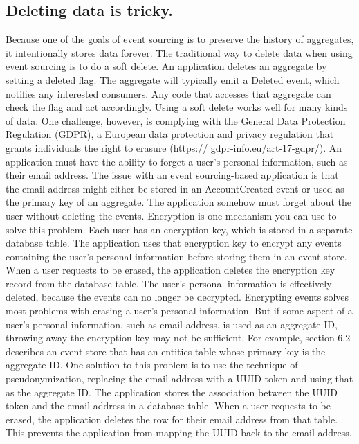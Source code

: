 \subsection{Deleting data is tricky.}

Because one of the goals of event sourcing is to preserve the history of aggregates, it
intentionally stores data forever. The traditional way to delete data when using event
sourcing is to do a soft delete. An application deletes an aggregate by setting a
deleted flag. The aggregate will typically emit a Deleted event, which notifies any
interested consumers. Any code that accesses that aggregate can check the flag and
act accordingly.
 Using a soft delete works well for many kinds of data. One challenge, however, is
complying with the General Data Protection Regulation (GDPR), a European data
protection and privacy regulation that grants individuals the right to erasure (https://
gdpr-info.eu/art-17-gdpr/). An application must have the ability to forget a user’s personal information, such as their email address. The issue with an event sourcing-based
application is that the email address might either be stored in an AccountCreated
event or used as the primary key of an aggregate. The application somehow must forget about the user without deleting the events.
 Encryption is one mechanism you can use to solve this problem. Each user has an
encryption key, which is stored in a separate database table. The application uses that
encryption key to encrypt any events containing the user’s personal information
before storing them in an event store. When a user requests to be erased, the application deletes the encryption key record from the database table. The user’s personal
information is effectively deleted, because the events can no longer be decrypted.
 Encrypting events solves most problems with erasing a user’s personal information.
But if some aspect of a user’s personal information, such as email address, is used as
an aggregate ID, throwing away the encryption key may not be sufficient. For example, section 6.2 describes an event store that has an entities table whose primary key
is the aggregate ID. One solution to this problem is to use the technique of pseudonymization, replacing the email address with a UUID token and using that as the
aggregate ID. The application stores the association between the UUID token and the
email address in a database table. When a user requests to be erased, the application
deletes the row for their email address from that table. This prevents the application
from mapping the UUID back to the email address. ~\citep{richardson2018microservices}

